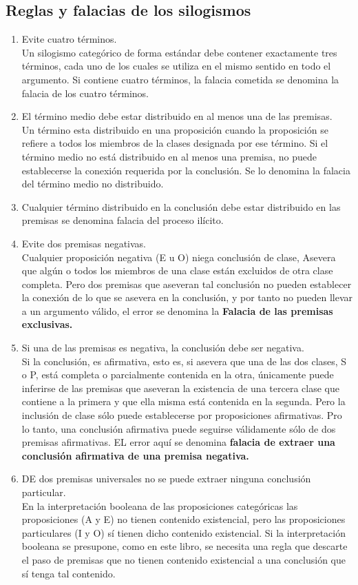 \documentclass[10pt]{book} 						%
\begin{document}
\subsection{Reglas y falacias de los silogismos}
\begin{enumerate}[regla 1.]
\item Evite cuatro términos.\\
Un silogismo categórico de forma estándar debe contener exactamente tres términos, cada uno de los cuales se utiliza en el mismo sentido en todo el argumento. Si contiene cuatro términos, la falacia cometida se denomina la falacia de los cuatro términos. 
\item El término medio debe estar distribuido en al menos una de las premisas.\\
Un término esta distribuido en una proposición cuando la proposición se refiere a todos los miembros de la clases designada por ese término. Si el término medio no está distribuido en al menos una premisa, no puede establecerse la conexión requerida por la conclusión. Se lo denomina la falacia del término medio no distribuido.
\item  Cualquier término distribuido en la conclusión debe estar distribuido en las premisas se denomina falacia del proceso ilícito.
\item Evite dos premisas negativas.\\
Cualquier proposición negativa (E u O) niega conclusión de clase, Asevera que algún o todos los miembros de una clase están excluidos de otra clase completa. Pero dos premisas que aseveran tal conclusión no pueden establecer la conexión de lo que se asevera en la conclusión, y por tanto no pueden llevar a un argumento válido, el error se denomina la \textbf{Falacia de las premisas exclusivas.}
\item Si una de las premisas es negativa, la conclusión debe ser negativa.\\
Si la conclusión, es afirmativa, esto es, si asevera que una de las dos clases, S o P, está completa o parcialmente contenida en la otra, únicamente puede inferirse de las premisas que aseveran la existencia de una tercera clase que contiene a la primera y que ella misma está contenida en la segunda. Pero la inclusión de clase sólo puede establecerse por proposiciones afirmativas. Pro lo tanto, una conclusión  afirmativa puede seguirse válidamente sólo de dos premisas afirmativas. EL error aquí se denomina \textbf{falacia de extraer una conclusión afirmativa de una premisa negativa.}
\item DE dos premisas universales no se puede extraer ninguna conclusión particular.\\
En la interpretación booleana de las proposiciones categóricas las proposiciones (A y E) no tienen contenido existencial, pero las proposiciones particulares (I y O) sí tienen dicho contenido existencial. Si la interpretación booleana se presupone, como en este libro, se necesita una regla que descarte el paso de premisas que no tienen contenido existencial a una conclusión que sí tenga tal contenido.
\end{enumerate}
\end{document}
